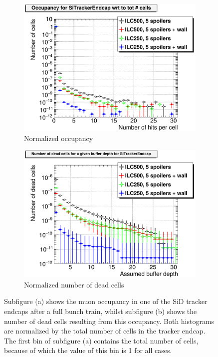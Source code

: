   \begin{figure}
 \centering
  \begin{subfigure}[b]{0.49\textwidth}
   \centering
    \includegraphics[width=\textwidth]{Figures/BDS_muons/Occupancy_Comparison_All_layers_wrt_cells_SiTrackerEndcap.png}
   \caption{Normalized occupancy}
   \end{subfigure}
   \hfill
    \begin{subfigure}[b]{0.49\textwidth}
   \centering
    \includegraphics[width=\textwidth]{Figures/BDS_muons/Occupancy_Comparison_All_layers_deadcells_SiTrackerEndcap.png}
   \caption{Normalized number of dead cells}
   \end{subfigure}
   \caption[SiD tracker endcap occupancy from BDS muons]{Subfigure (a) shows the muon occupancy in one of the SiD tracker endcaps after a full bunch train, whilst subfigure (b) shows the number of dead cells resulting from this occupancy.
   Both histograms are normalized by the total number of cells in the tracker endcap.
   The first bin of subfigure (a) contains the total number of cells, because of which the value of this bin is 1 for all cases.}
   \label{fig:BDS_Muons:SiTrackerEndcap}
 \end{figure}
 
